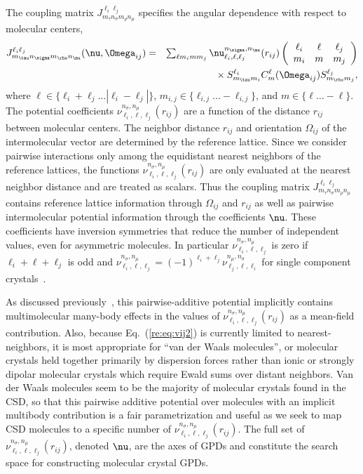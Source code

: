 \documentclass[preprint]{iucr}              %
\newcommand{\mb}[1]{\ensuremath{\mbox{\boldmath $ #1 $}}}
\begin{document}
The coupling matrix $J_{m_\tau n_\sigma m_\rho n_\mu}^{\ell_i
\ell_j}$ specifies the angular dependence with respect to molecular
centers,
\begin{eqnarray}
\label{coupling} J_{m_\tau n_\sigma m_\rho n_\mu}^{\ell_i
\ell_j}(\mb{\nu},\mb{\Omega}_{ij})&=&\sum_{\ell m_i m m_j}
\nu_{\ell_i,\ell,\ell_j}^{n_\sigma,n_\mu}(r_{ij})\left(\begin{array}{ccc}
 \ell_i & \ell & \ell_j \\ m_i & m & m_j
\end{array}\right)\nonumber\\
&&{}\times S^{\ell_i}_{m_\tau m_i}C_{m}^{\ell}(\mb{\Omega}_{ij})
S^{\ell_j}_{m_\rho m_j},
\end{eqnarray}
where $\ell\in\{\ell_i + \ell_j\ldots|\ell_i - \ell_j|\}$,
$m_{i,j}\in\{\ell_{i,j}...-\ell_{i,j}\}$, and $m\in\{\ell\ldots-\ell\}$. The
potential coefficients $\nu_{\ell_i,\ell,\ell_j}^{n_\sigma,n_\mu}(r_{ij})$ are a function
of the distance $r_{ij}$ between molecular centers. The neighbor
distance $r_{ij}$ and orientation $\Omega_{ij}$ of the
intermolecular vector are determined by the reference lattice. Since
we consider pairwise interactions only among the equidistant nearest
neighbors of the reference lattices, the functions
$\nu_{\ell_i,\ell,\ell_j}^{n_\sigma,n_\mu}(r_{ij})$ are only
evaluated at the nearest neighbor distance and are treated as
scalars. Thus the coupling matrix $J_{m_\tau n_\sigma m_\rho
n_\mu}^{\ell_i \ell_j}$ contains reference lattice information
through $\Omega_{ij}$ and $r_{ij}$ as well as pairwise
intermolecular potential information through the coefficients
$\mb{\nu}$. These coefficients have inversion symmetries that reduce
the number of independent values, even for asymmetric molecules.  In
particular $\nu_{\ell_i,\ell,\ell_j}^{n_\sigma,n_\mu}$ is zero if
$\ell_i+\ell+\ell_j$ is odd and
$\nu_{\ell_i,\ell,\ell_j}^{n_\sigma,n_\mu}=
(-1)^{\ell_i+\ell_j}\nu_{\ell_j,\ell,\ell_i}^{n_\mu,n_\sigma}$ for
single component crystals~\cite{Avoird80}. 

As discussed previously~\cite{Mettes04}, this pairwise-additive potential
implicitly contains multimolecular many-body effects in
the values of $\nu_{\ell_i,\ell,\ell_j}^{n_\sigma,n_\mu}(r_{ij})$ as a
mean-field contribution.  Also, because Eq.~(\ref{re:eq:vij2}) is currently
limited to nearest-neighbors, it is most appropriate for ``van der Waals
molecules'', or molecular crystals held together primarily by dispersion forces
rather than ionic or strongly dipolar molecular crystals which
require Ewald sums over distant neighbors. Van der Waals
molecules seem to be the majority
of molecular crystals found in the CSD, so that this pairwise additive
potential over molecules with an implicit multibody contribution is a fair
parametrization and useful as we seek to map CSD molecules to a specific number
of $\nu_{\ell_i,\ell,\ell_j}^{n_\sigma,n_\mu}(r_{ij})$. The full set of $\nu_{\ell_i,\ell,\ell_j}^{n_\sigma,n_\mu}(r_{ij})$, denoted $\mb{\nu}$, are the axes of GPDs and constitute the search space for constructing molecular crystal GPDs.
\end{document}
